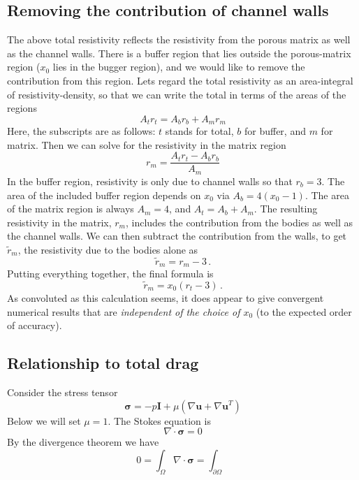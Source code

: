 \documentclass[11pt]{article}
\newcommand{\grad}{\nabla}
\newcommand{\bvec}[1]{\ensuremath{\boldsymbol{#1}}}
\newcommand {\bu} {\bvec{u}}
\begin{document}
\subsection{Removing the contribution of channel walls}
The above total resistivity reflects the resistivity from the porous matrix as well as the channel walls. There is a buffer region that lies outside the porous-matrix region ($x_0$ lies in the bugger region), and we would like to remove the contribution from this region. Lets regard the total resistivity as an area-integral of resistivity-density, so that we can write the total in terms of the areas of the regions
\begin{equation}
A_{t} r_{t} = A_{b} r_{b} + A_{m} r_{m}
\end{equation}
Here, the subscripts are as follows: $t$ stands for total, $b$ for buffer, and $m$ for matrix. Then we can solve for the resistivity in the matrix region
\begin{equation}
r_m = \frac{A_t r_t - A_b r_b}{A_m}
\end{equation}
In the buffer region, resistivity is only due to channel walls so that $r_b = 3$. The area of the included buffer region depends on $x_0$ via $A_b = 4(x_0 - 1)$. The area of the matrix region is always $A_m = 4$, and $A_t = A_b + A_m$. The resulting resistivity in the matrix, $r_m$, includes the contribution from the bodies as well as the channel walls. We can then subtract the contribution from the walls, to get $\tilde{r}_m$, the resistivity due to the bodies alone as
\begin{equation}
\tilde{r}_m = r_m - 3 \, .
\end{equation}
Putting everything together, the final formula is
\begin{equation}
\tilde{r}_m = x_0 (r_t - 3) \, .
\end{equation}
As convoluted as this calculation seems, it does appear to give convergent numerical results that are {\em independent of the choice of $x_0$} (to the expected order of accuracy).

\subsection{Relationship to total drag}

Consider the stress tensor
\begin{equation}
\bvec{\sigma} = -p \bvec{I} + \mu \left( \grad \bu + \grad \bu^T \right)
\end{equation}
Below we will set $\mu=1$. The Stokes equation is
\begin{equation}
\grad \cdot \bvec{\sigma} = 0
\end{equation}
By the divergence theorem we have
\begin{equation}
0 = \int_{\Omega} \grad \cdot \bvec{\sigma} = \int_{\partial \Omega}
\end{equation}
\end{document}
